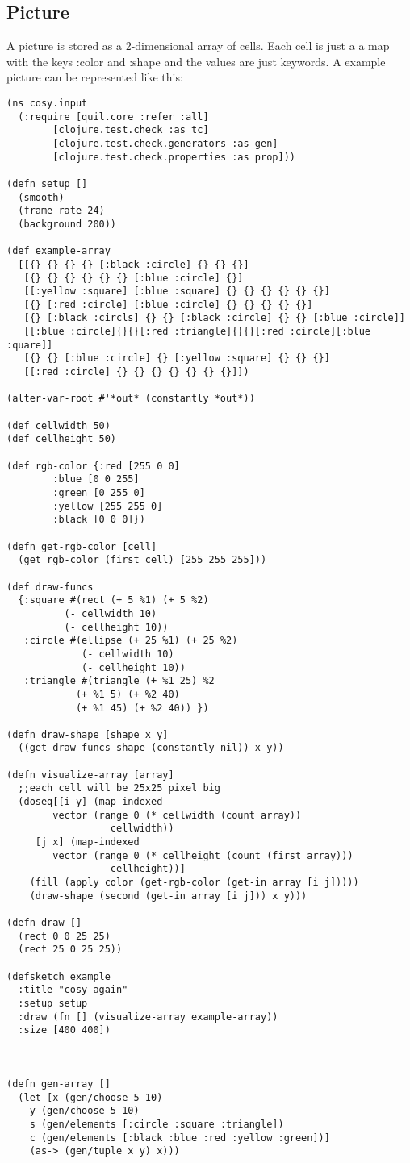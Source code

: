 \documentclass[11pt,a4paper,oneside]{scrartcl}
\begin{document}
\subsection{Picture}
\label{sec-2-1}
A picture is stored as a 2-dimensional array of cells. Each cell is
just a a map with the keys :color and :shape and the values are
just keywords. A example picture can be represented like this:
\begin{verbatim}
(ns cosy.input
  (:require [quil.core :refer :all]
	    [clojure.test.check :as tc]
	    [clojure.test.check.generators :as gen]
	    [clojure.test.check.properties :as prop]))

(defn setup []
  (smooth)                         
  (frame-rate 24)                  
  (background 200))                

(def example-array
  [[{} {} {} {} [:black :circle] {} {} {}]
   [{} {} {} {} {} {} [:blue :circle] {}]
   [[:yellow :square] [:blue :square] {} {} {} {} {} {}]
   [{} [:red :circle] [:blue :circle] {} {} {} {} {}]
   [{} [:black :circls] {} {} [:black :circle] {} {} [:blue :circle]]
   [[:blue :circle]{}{}[:red :triangle]{}{}[:red :circle][:blue :quare]]
   [{} {} [:blue :circle] {} [:yellow :square] {} {} {}]
   [[:red :circle] {} {} {} {} {} {} {}]])

(alter-var-root #'*out* (constantly *out*))

(def cellwidth 50)
(def cellheight 50)

(def rgb-color {:red [255 0 0]
		:blue [0 0 255]
		:green [0 255 0]
		:yellow [255 255 0]
		:black [0 0 0]})

(defn get-rgb-color [cell]
  (get rgb-color (first cell) [255 255 255]))

(def draw-funcs
  {:square #(rect (+ 5 %1) (+ 5 %2)
		  (- cellwidth 10)
		  (- cellheight 10))
   :circle #(ellipse (+ 25 %1) (+ 25 %2)
		     (- cellwidth 10)
		     (- cellheight 10))
   :triangle #(triangle (+ %1 25) %2
			(+ %1 5) (+ %2 40)
			(+ %1 45) (+ %2 40)) })

(defn draw-shape [shape x y]
  ((get draw-funcs shape (constantly nil)) x y))

(defn visualize-array [array]
  ;;each cell will be 25x25 pixel big
  (doseq[[i y] (map-indexed
		vector (range 0 (* cellwidth (count array))
			      cellwidth))
	 [j x] (map-indexed
		vector (range 0 (* cellheight (count (first array)))
			      cellheight))]
    (fill (apply color (get-rgb-color (get-in array [i j]))))
    (draw-shape (second (get-in array [i j])) x y)))

(defn draw []
  (rect 0 0 25 25)
  (rect 25 0 25 25))

(defsketch example                 
  :title "cosy again" 
  :setup setup                     
  :draw (fn [] (visualize-array example-array))
  :size [400 400])              



(defn gen-array []
  (let [x (gen/choose 5 10)
	y (gen/choose 5 10)
	s (gen/elements [:circle :square :triangle])
	c (gen/elements [:black :blue :red :yellow :green])]
    (as-> (gen/tuple x y) x)))
\end{verbatim}
\end{document}

